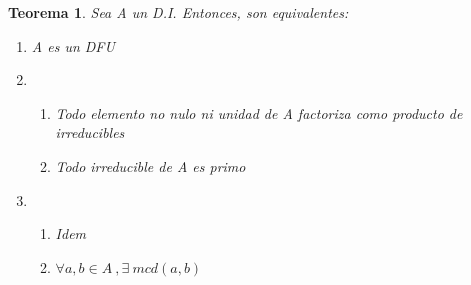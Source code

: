 \documentclass[11pt, a4paper, titlepage]{article}
\theoremstyle{theorem-style}
\newtheorem*{nth}{Teorema}
\theoremstyle{definition-style}
\theoremstyle{remark-style}
\theoremstyle{example-style}
\newenvironment{nlist}
{\begin{enumerate}
\renewcommand\labelenumi{(\emph{\roman{enumi})}}}
{\end{enumerate}}
\begin{document}
\begin{nth}
	Sea A un D.I. Entonces, son equivalentes:
	\begin{nlist}
	\item A es un DFU
	\item \begin{enumerate}
	\item Todo elemento no nulo ni unidad de A factoriza como producto de irreducibles
	\item Todo irreducible de A es primo
\end{enumerate}
	\item \begin{enumerate}
	\item Idem
	\item $\forall a,b \in A \ , \exists \ mcd(a,b)$
\end{enumerate}
\end{nlist}
\end{nth}
\end{document}
